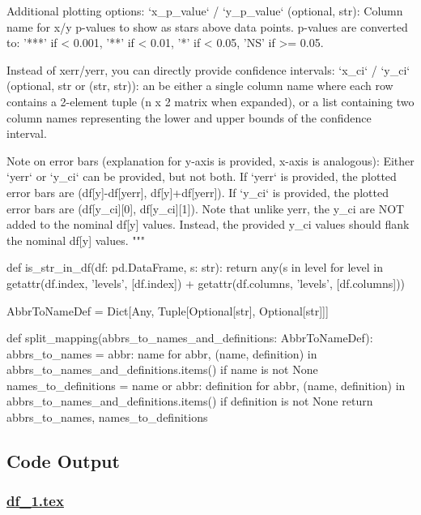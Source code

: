 \documentclass[11pt]{article}
\begin{document}
\begin{python}
    Additional plotting options:
    `x_p_value` / `y_p_value` (optional, str): Column name for x/y p-values to show as stars above data points.
        p-values are converted to: '***' if < 0.001, '**' if < 0.01, '*' if < 0.05, 'NS' if >= 0.05.

    Instead of xerr/yerr, you can directly provide confidence intervals:
    `x_ci` / `y_ci` (optional, str or (str, str)): an be either a single column name where each row contains
        a 2-element tuple (n x 2 matrix when expanded), or a list containing two column names 
        representing the lower and upper bounds of the confidence interval.

    Note on error bars (explanation for y-axis is provided, x-axis is analogous):
    Either `yerr` or `y_ci` can be provided, but not both.
    If `yerr` is provided, the plotted error bars are (df[y]-df[yerr], df[y]+df[yerr]).
    If `y_ci` is provided, the plotted error bars are (df[y_ci][0], df[y_ci][1]).
    Note that unlike yerr, the y_ci are NOT added to the nominal df[y] values. 
    Instead, the provided y_ci values should flank the nominal df[y] values.
    """

def is_str_in_df(df: pd.DataFrame, s: str):
    return any(s in level for level in getattr(df.index, 'levels', [df.index]) + getattr(df.columns, 'levels', [df.columns]))

AbbrToNameDef = Dict[Any, Tuple[Optional[str], Optional[str]]]

def split_mapping(abbrs_to_names_and_definitions: AbbrToNameDef):
    abbrs_to_names = {abbr: name for abbr, (name, definition) in abbrs_to_names_and_definitions.items() if name is not None}
    names_to_definitions = {name or abbr: definition for abbr, (name, definition) in abbrs_to_names_and_definitions.items() if definition is not None}
    return abbrs_to_names, names_to_definitions

\end{python}



\subsection{Code Output}\hypertarget{file-df-1-tex}{}

\subsubsection*{\hyperlink{code-LaTeX Table Design-df-1-tex}{df\_1.tex}}
\end{document}
